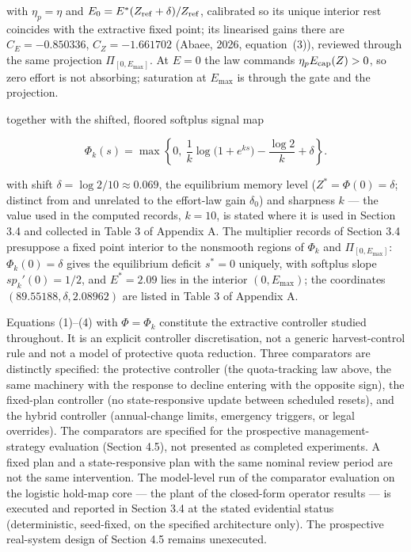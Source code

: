 \documentclass[11pt]{article}
\begin{document}
with \(\eta_p = \eta\) and \(E_0 = E^*(Z_{\rm ref}+\delta)/Z_{\rm ref}\), calibrated so its unique interior rest coincides with the extractive fixed point; its linearised gains there are \(C_E = -0.850336\), \(C_Z = -1.661702\) (Abaee, 2026, equation~(3)), reviewed through the same projection \(\Pi_{[0,E_{\max}]}\). At \(E=0\) the law commands \(\eta_p E_{\rm cap}(Z)>0\), so zero effort is not absorbing; saturation at \(E_{\max}\) is through the gate and the projection.

together with the shifted, floored softplus signal map

\[
\Phi_k(s)=\max\left\{0,\ \frac{1}{k}\log\!\bigl(1+e^{ks}\bigr)-\frac{\log 2}{k}+\delta\right\}.
\]

with shift \(\delta = \log 2/10 \approx 0.069\), the equilibrium memory level (\(Z^* = \Phi(0) = \delta\); distinct from
and unrelated to the effort-law gain \(\delta_0\)) and sharpness \(k\)
--- the value used in the computed records, \(k = 10\), is stated where it is used in Section 3.4 and collected in Table 3 of Appendix A. The
multiplier records of Section 3.4 presuppose a fixed point interior to
the nonsmooth regions of \(\Phi_k\) and \(\Pi_{[0,E_{\max}]}\):
\(\Phi_k(0) = \delta\) gives the equilibrium deficit \(s^* = 0\)
uniquely, with softplus slope \(sp_k'(0) = 1/2\), and \(E^* = 2.09\)
lies in the interior \((0, E_{\max})\); the coordinates
\((89.55188, \delta, 2.08962)\) are listed in Table 3 of Appendix A.

Equations (1)--(4) with \(\Phi=\Phi_k\) constitute the extractive
controller studied throughout. It is an explicit controller
discretisation, not a generic harvest-control rule and not a model of
protective quota reduction. Three comparators are distinctly specified: the protective controller (the quota-tracking law above, the same machinery with the
response to decline entering with the opposite sign), the fixed-plan
controller (no state-responsive update between scheduled resets), and
the hybrid controller (annual-change limits, emergency triggers, or
legal overrides). The comparators are specified for the prospective
management-strategy evaluation (Section 4.5), not presented as completed
experiments. A fixed plan and a state-responsive plan with the same
nominal review period are not the same intervention. The model-level run
of the comparator evaluation on the logistic hold-map core --- the plant
of the closed-form operator results --- is executed and reported in
Section 3.4 at the stated evidential status (deterministic,
seed-fixed, on the specified architecture only). The prospective
real-system design of Section 4.5 remains unexecuted.
\end{document}
